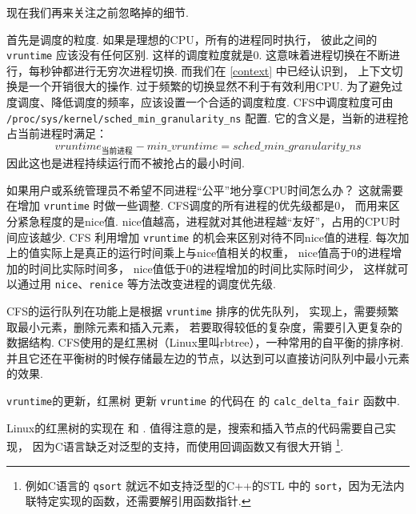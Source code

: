 现在我们再来关注之前忽略掉的细节.

首先是调度的粒度.
如果是理想的CPU，所有的进程同时执行，
彼此之间的 \lstinline{vruntime} 应该没有任何区别.
这样的调度粒度就是0.
这意味着进程切换在不断进行，每秒钟都进行无穷次进程切换.
而我们在 \ref{context} 中已经认识到，
上下文切换是一个开销很大的操作.
过于频繁的切换显然不利于有效利用CPU.
为了避免过度调度、降低调度的频率，应该设置一个合适的调度粒度.\cite{CFSSched96:online}
CFS中调度粒度可由 \lstinline{/proc/sys/kernel/sched_min_granularity_ns} 配置.
它的含义是，当新的进程抢占当前进程时满足：
\begin{equation*}
	vruntime_{\mbox{当前进程}}-min\_vruntime = sched\_min\_granularity\_ns
\end{equation*}
因此这也是进程持续运行而不被抢占的最小时间.

如果用户或系统管理员不希望不同进程“公平”地分享CPU时间怎么办？
这就需要在增加 \lstinline{vruntime} 时做一些调整.
CFS调度的所有进程的优先级都是0，
而用来区分紧急程度的是nice值.
nice值越高，进程就对其他进程越“友好”，占用的CPU时间应该越少.
CFS 利用增加 \lstinline{vruntime} 的机会来区别对待不同nice值的进程.
每次加上的值实际上是真正的运行时间乘上与nice值相关的权重，
nice值高于0的进程增加的时间比实际时间多，
nice值低于0的进程增加的时间比实际时间少，
这样就可以通过用 \lstinline{nice}、\lstinline{renice} 等方法改变进程的调度优先级.

CFS的运行队列在功能上是根据 \lstinline{vruntime} 排序的优先队列，
实现上，需要频繁取最小元素，删除元素和插入元素，
若要取得较低的复杂度，需要引入更复杂的数据结构.
CFS使用的是红黑树（Linux里叫rbtree），一种常用的自平衡的排序树.
并且它还在平衡树的时候存储最左边的节点，以达到可以直接访问队列中最小元素的效果.

\begin{readsrcbox}{\lstinline{vruntime}的更新，红黑树}
	更新 \lstinline{vruntime} 的代码在  的
	\lstinline{calc_delta_fair} 函数中.

	Linux的红黑树的实现在  和
	.
	值得注意的是，搜索和插入节点的代码需要自己实现，
	因为C语言缺乏对泛型的支持，而使用回调函数又有很大开销%
	\footnote{
		例如C语言的 \lstinline{qsort} 就远不如支持泛型的C++的STL 中的
		\lstinline{sort}，因为无法内联特定实现的函数，还需要解引用函数指针.}.
\end{readsrcbox}

